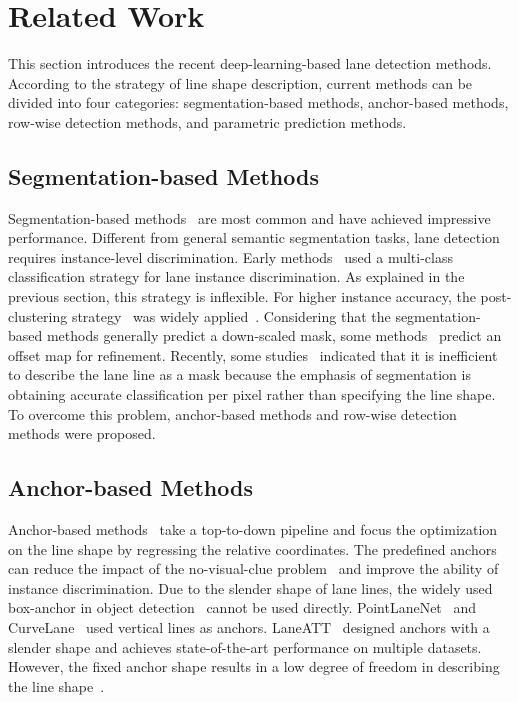 \documentclass[10pt,twocolumn,letterpaper]{article}
\begin{document}
\section{Related Work}
This section introduces the recent deep-learning-based lane detection methods. According to the strategy of line shape description, current methods can be divided into four categories: segmentation-based methods, anchor-based methods, row-wise detection methods, and parametric prediction methods.

\subsection{Segmentation-based Methods}

Segmentation-based methods~\cite{pan2018spatial,hou2019learning, neven2018towards, ko2020key, lee2017vpgnet, ghafoorian2018gan} are most common and have achieved impressive performance. 
Different from general semantic segmentation tasks, lane detection requires instance-level discrimination. Early methods~\cite{pan2018spatial,ghafoorian2018gan} used a multi-class classification strategy for lane instance discrimination. As explained in the previous section, this strategy is inflexible. 
For higher instance accuracy, the post-clustering strategy~\cite{de2017semantic} was widely applied~\cite{neven2018towards,ko2020key}.
Considering that the segmentation-based methods generally predict a down-scaled mask, some methods~\cite{ko2020key} predict an offset map for refinement.
Recently, some studies~\cite{chougule2018reliable, qin2020ultra} indicated that it is inefficient to describe the lane line as a mask because the emphasis of segmentation is obtaining accurate classification per pixel rather than specifying the line shape. 
To overcome this problem, anchor-based methods and row-wise detection methods were proposed.

\subsection{Anchor-based Methods}
Anchor-based methods~\cite{tabelini2020keep, chen2019pointlanenet, li2020curvelane} take a top-to-down pipeline and focus the optimization on the line shape by regressing the relative coordinates.  
The predefined anchors can reduce the impact of the no-visual-clue problem~\cite{tabelini2020keep} and improve the ability of instance discrimination. 
Due to the slender shape of lane lines, the widely used box-anchor in object detection~\cite{he2017mask} cannot be used directly.  PointLaneNet~\cite{chen2019pointlanenet} and CurveLane~\cite{li2020curvelane} used vertical lines as anchors. LaneATT~\cite{tabelini2020keep} designed anchors with a slender shape and achieves state-of-the-art performance on multiple datasets. However, the fixed anchor shape results in a low degree of freedom in describing the line shape~\cite{li2020curvelane}.
\end{document}
